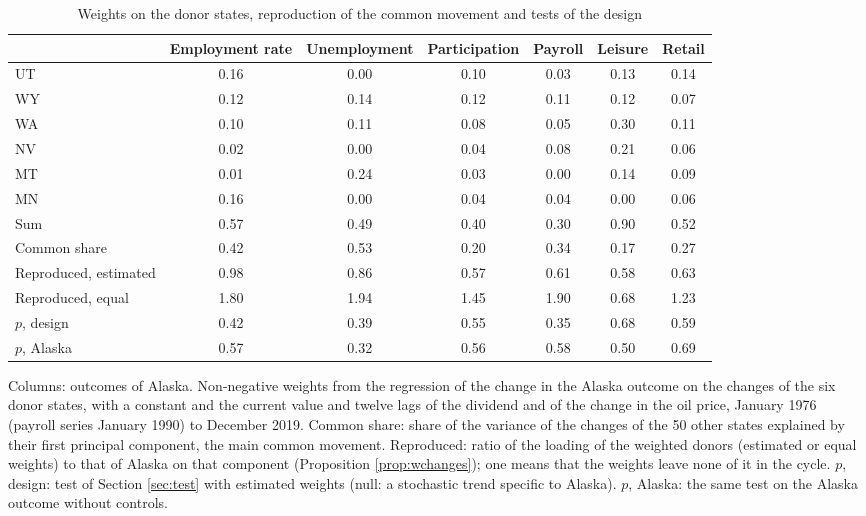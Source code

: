 \begin{table}[htbp]
\centering
\caption{Weights on the donor states, reproduction of the common movement and tests of the design\label{tab:ak-weights}}
\footnotesize
\setlength{\tabcolsep}{4pt}
\begin{tabular}{lcccccc}
\toprule
 & Employment rate & Unemployment & Participation & Payroll & Leisure & Retail \\
\midrule
UT & 0.16 & 0.00 & 0.10 & 0.03 & 0.13 & 0.14 \\
WY & 0.12 & 0.14 & 0.12 & 0.11 & 0.12 & 0.07 \\
WA & 0.10 & 0.11 & 0.08 & 0.05 & 0.30 & 0.11 \\
NV & 0.02 & 0.00 & 0.04 & 0.08 & 0.21 & 0.06 \\
MT & 0.01 & 0.24 & 0.03 & 0.00 & 0.14 & 0.09 \\
MN & 0.16 & 0.00 & 0.04 & 0.04 & 0.00 & 0.06 \\
\midrule
Sum & 0.57 & 0.49 & 0.40 & 0.30 & 0.90 & 0.52 \\
\midrule
Common share & 0.42 & 0.53 & 0.20 & 0.34 & 0.17 & 0.27 \\
Reproduced, estimated & 0.98 & 0.86 & 0.57 & 0.61 & 0.58 & 0.63 \\
Reproduced, equal & 1.80 & 1.94 & 1.45 & 1.90 & 0.68 & 1.23 \\
\midrule
$p$, design & 0.42 & 0.39 & 0.55 & 0.35 & 0.68 & 0.59 \\
$p$, Alaska & 0.57 & 0.32 & 0.56 & 0.58 & 0.50 & 0.69 \\
\bottomrule
\end{tabular}
\par\smallskip\parbox{0.95\textwidth}{\footnotesize Columns: outcomes of Alaska. Non-negative weights from the regression of the change in the Alaska outcome on the changes of the six donor states, with a constant and the current value and twelve lags of the dividend and of the change in the oil price, January 1976 (payroll series January 1990) to December 2019. Common share: share of the variance of the changes of the 50 other states explained by their first principal component, the main common movement. Reproduced: ratio of the loading of the weighted donors (estimated or equal weights) to that of Alaska on that component (Proposition \ref{prop:wchanges}); one means that the weights leave none of it in the cycle. $p$, design: test of Section \ref{sec:test} with estimated weights (null: a stochastic trend specific to Alaska). $p$, Alaska: the same test on the Alaska outcome without controls.}
\end{table}
